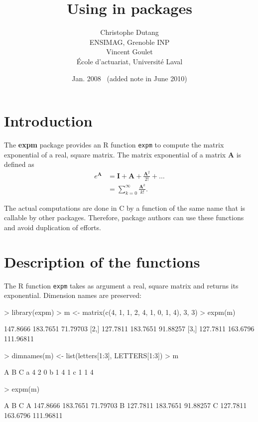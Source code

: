 \documentclass{article}
\title{Using \pkg{expm} in packages}
\author{Christophe Dutang \\ ENSIMAG, Grenoble INP \\[3ex]
    Vincent Goulet \\ \'Ecole d'actuariat, Universit\'e Laval}
\date{Jan. 2008 \ {\footnotesize (added note in June 2010)}}
\newcommand{\code}[1]{\texttt{#1}}
\newcommand{\proglang}[1]{\textsf{#1}}
\newcommand{\pkg}[1]{\textbf{#1}}
\newcommand{\mat}[1]{\mathbf{#1}}
\begin{document}
\maketitle

\section{Introduction}

The \pkg{expm} package provides an \proglang{R} function \code{expm}
to compute the matrix exponential of a real, square matrix. The matrix
exponential of a matrix $\mat{A}$ is defined as
\begin{align*}
  e^{\mat{A}}
  &= \mat{I} + \mat{A} + \frac{\mat{A}^2}{2!} + \dots \\
  &= \sum_{k = 0}^\infty \frac{\mat{A}^k}{k!}.
\end{align*}

The actual computations are done in \proglang{C} by a function
of the same name that is callable by other packages. Therefore,
package authors can use these functions and avoid duplication of
efforts.

\section{Description of the functions}

The \proglang{R} function \texttt{expm} takes as argument a real,
square matrix and returns its exponential. Dimension names are
preserved:
\begin{Schunk}
\begin{Sinput}
> library(expm)
> m <- matrix(c(4, 1, 1, 2, 4, 1, 0, 1, 4), 3, 3)
> expm(m)
\end{Sinput}
\begin{Soutput}
         [,1]     [,2]      [,3]
[1,] 147.8666 183.7651  71.79703
[2,] 127.7811 183.7651  91.88257
[3,] 127.7811 163.6796 111.96811
\end{Soutput}
\begin{Sinput}
> dimnames(m) <- list(letters[1:3], LETTERS[1:3])
> m
\end{Sinput}
\begin{Soutput}
  A B C
a 4 2 0
b 1 4 1
c 1 1 4
\end{Soutput}
\begin{Sinput}
> expm(m)
\end{Sinput}
\begin{Soutput}
         A        B         C
A 147.8666 183.7651  71.79703
B 127.7811 183.7651  91.88257
C 127.7811 163.6796 111.96811
\end{Soutput}
\end{Schunk}
\end{document}
